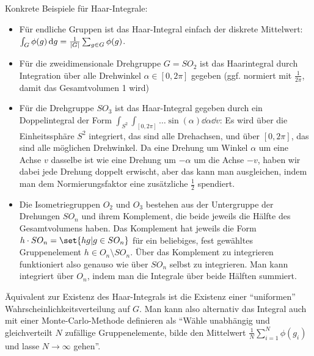 \begin{definition}
	Konkrete Beispiele für Haar-Integrale:
	
	\begin{itemize}
	\item Für endliche Gruppen ist das Haar-Integral einfach der diskrete Mittelwert: $\int_G \phi(g) \,\textrm{d} g = \frac{1}{\lvert G\rvert} \sum_{g\in G} \phi(g)$.
	\item Für die zweidimensionale Drehgruppe $G=SO_2$ ist das Haarintegral durch Integration über alle Drehwinkel $\alpha\in[0,2\pi]$ gegeben (ggf. normiert mit $\frac{1}{2\pi}$, damit das Gesamtvolumen 1 wird)
	\item Für die Drehgruppe $SO_3$ ist das Haar-Integral gegeben durch ein Doppelintegral der Form $\int_{S^2} \int_{[0,2\pi]} \ldots \sin(\alpha)\dd \alpha \dd v$: Es wird über die Einheitssphäre $S^2$ integriert, das sind alle Drehachsen, und über $[0,2\pi]$, das sind alle möglichen Drehwinkel. Da eine Drehung um Winkel $\alpha$ um eine Achse $v$ dasselbe ist wie eine Drehung um $-\alpha$ um die Achse $-v$, haben wir dabei jede Drehung doppelt erwischt, aber das kann man ausgleichen, indem man dem Normierungsfaktor eine zusätzliche $\frac{1}{2}$ spendiert.
	\item Die Isometriegruppen $O_2$ und $O_3$ bestehen aus der Untergruppe der Drehungen $SO_n$ und ihrem Komplement, die beide jeweils die Hälfte des Gesamtvolumens haben. Das Komplement hat jeweils die Form $h\cdot SO_n = \set{hg | g\in SO_n}$ für ein beliebiges, fest gewähltes Gruppenelement $h\in O_n \setminus SO_n$. Über das Komplement zu integrieren funktioniert also genauso wie über $SO_n$ selbst zu integrieren. Man kann integriert über $O_n$, indem man die Integrale über beide Hälften summiert.
	\end{itemize}
	
	Äquivalent zur Existenz des Haar-Integrals ist die Existenz einer \enquote{uniformen} Wahrscheinlichkeitsverteilung auf $G$. Man kann also alternativ das Integral auch mit einer Monte-Carlo-Methode definieren als \enquote{Wähle unabhängig und gleichverteilt $N$ zufällige Gruppenelemente, bilde den Mittelwert $\frac{1}{N} \sum_{i=1}^N \phi(g_i)$ und lasse $N\to\infty$ gehen}.
\end{definition}

